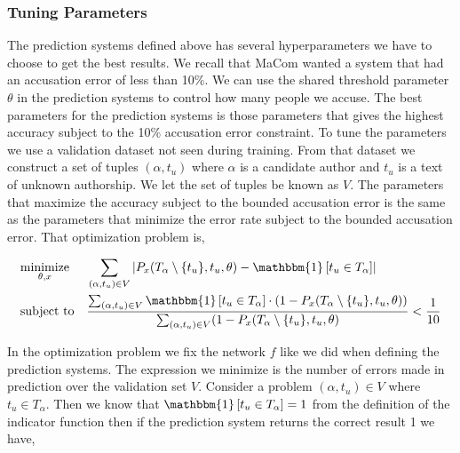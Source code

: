 \subsubsection{Tuning Parameters}
\label{subsubsec:tuning_parameters}

The prediction systems defined above has several hyperparameters we have to
choose to get the best results. We recall that MaCom wanted a system that
had an accusation error of less than 10\%. We can use the shared threshold
parameter $\theta$ in the prediction systems to control how many people we
accuse. The best parameters for the prediction systems is those parameters that
gives the highest accuracy subject to the 10\% accusation error constraint. To
tune the parameters we use a validation dataset not seen during training. From
that dataset we construct a set of tuples $(\alpha, t_u)$ where $\alpha$ is a
candidate author and $t_u$ is a text of unknown authorship. We let the set of
tuples be known as $V$. The parameters that maximize the accuracy subject to the
bounded accusation error is the same as the parameters that minimize the error
rate subject to the bounded accusation error. That optimization problem is,

\begin{equation}
    \label{eq:prediction_system_minimization}
    \begin{aligned}
        & \underset{\theta, x}{\text{minimize}}
        & & \sum_{(\alpha, t_u) \in V} \left|
            P_x(T_\alpha \setminus \{t_u\}, t_u, \theta) -
            \mathbbm{1}\left[t_u \in T_\alpha\right]
        \right| \\
        & \text{subject to}
        & & \frac{\sum_{(\alpha, t_u) \in V} \mathbbm{1}\left[t_u \in T_\alpha\right] \cdot
            \left(1 - P_x(T_\alpha \setminus \{t_u\}, t_u, \theta)\right)}
{\sum_{(\alpha, t_u) \in V} (1 - P_x(T_\alpha \setminus \{t_u\}, t_u, \theta)} <
            \frac{1}{10}
    \end{aligned}
\end{equation}

In the optimization problem we fix the network $f$ like we did when defining
the prediction systems. The expression we minimize is the number of errors made
in prediction over the validation set $V$. Consider a problem $(\alpha, t_u)
\in V$ where $t_u \in T_\alpha$. Then we know that $\mathbbm{1}\left[t_u \in
T_\alpha\right] = 1$ from the definition of the indicator function then if the
prediction system returns the correct result 1 we have,

